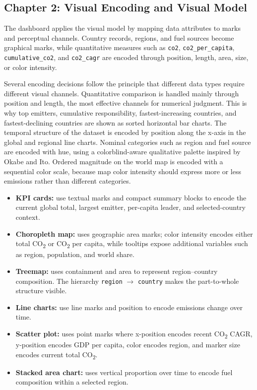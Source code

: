 \documentclass[a4paper,12pt]{article}
\begin{document}
\subsection{Chapter 2: Visual Encoding and Visual Model}

The dashboard applies the visual model by mapping data attributes to marks and perceptual
channels. Country records, regions, and fuel sources become graphical marks, while
quantitative measures such as \texttt{co2}, \texttt{co2\_per\_capita},
\texttt{cumulative\_co2}, and \texttt{co2\_cagr} are encoded through position, length,
area, size, or color intensity.

Several encoding decisions follow the principle that different data types require
different visual channels. Quantitative comparison is handled mainly through position and
length, the most effective channels for numerical judgment. This is why top emitters,
cumulative responsibility, fastest-increasing countries, and fastest-declining countries
are shown as sorted horizontal bar charts. The temporal structure of the dataset is
encoded by position along the x-axis in the global and regional line charts. Nominal
categories such as region and fuel source are encoded with hue, using a colorblind-aware
qualitative palette inspired by Okabe and Ito. Ordered magnitude on the world map is
encoded with a sequential color scale, because map color intensity should express more
or less emissions rather than different categories.

\begin{itemize}
    \item \textbf{KPI cards:} use textual marks and compact summary blocks to encode the
    current global total, largest emitter, per-capita leader, and selected-country context.
    \item \textbf{Choropleth map:} uses geographic area marks; color intensity encodes
    either total CO\textsubscript{2} or CO\textsubscript{2} per capita, while tooltips
    expose additional variables such as region, population, and world share.
    \item \textbf{Treemap:} uses containment and area to represent region--country
    composition. The hierarchy \texttt{region} $\rightarrow$ \texttt{country} makes the
    part-to-whole structure visible.
    \item \textbf{Line charts:} use line marks and position to encode emissions change
    over time.
    \item \textbf{Scatter plot:} uses point marks where x-position encodes recent
    CO\textsubscript{2} CAGR, y-position encodes GDP per capita, color encodes region,
    and marker size encodes current total CO\textsubscript{2}.
    \item \textbf{Stacked area chart:} uses vertical proportion over time to encode fuel
    composition within a selected region.
\end{itemize}
\end{document}
